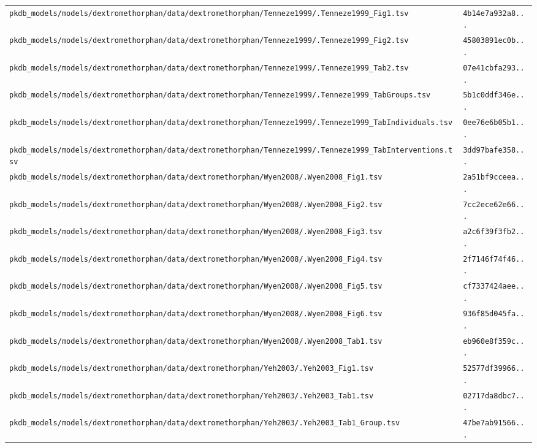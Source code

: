 \begin{longtable}{ll}
\texttt{pkdb\_models/models/dextromethorphan/data/dextromethorphan/Tenneze1999/.Tenneze1999\_Fig1.tsv} & \texttt{4b14e7a932a8...} \\
\texttt{pkdb\_models/models/dextromethorphan/data/dextromethorphan/Tenneze1999/.Tenneze1999\_Fig2.tsv} & \texttt{45803891ec0b...} \\
\texttt{pkdb\_models/models/dextromethorphan/data/dextromethorphan/Tenneze1999/.Tenneze1999\_Tab2.tsv} & \texttt{07e41cbfa293...} \\
\texttt{pkdb\_models/models/dextromethorphan/data/dextromethorphan/Tenneze1999/.Tenneze1999\_TabGroups.tsv} & \texttt{5b1c0ddf346e...} \\
\texttt{pkdb\_models/models/dextromethorphan/data/dextromethorphan/Tenneze1999/.Tenneze1999\_TabIndividuals.tsv} & \texttt{0ee76e6b05b1...} \\
\texttt{pkdb\_models/models/dextromethorphan/data/dextromethorphan/Tenneze1999/.Tenneze1999\_TabInterventions.tsv} & \texttt{3dd97bafe358...} \\
\texttt{pkdb\_models/models/dextromethorphan/data/dextromethorphan/Wyen2008/.Wyen2008\_Fig1.tsv} & \texttt{2a51bf9cceea...} \\
\texttt{pkdb\_models/models/dextromethorphan/data/dextromethorphan/Wyen2008/.Wyen2008\_Fig2.tsv} & \texttt{7cc2ece62e66...} \\
\texttt{pkdb\_models/models/dextromethorphan/data/dextromethorphan/Wyen2008/.Wyen2008\_Fig3.tsv} & \texttt{a2c6f39f3fb2...} \\
\texttt{pkdb\_models/models/dextromethorphan/data/dextromethorphan/Wyen2008/.Wyen2008\_Fig4.tsv} & \texttt{2f7146f74f46...} \\
\texttt{pkdb\_models/models/dextromethorphan/data/dextromethorphan/Wyen2008/.Wyen2008\_Fig5.tsv} & \texttt{cf7337424aee...} \\
\texttt{pkdb\_models/models/dextromethorphan/data/dextromethorphan/Wyen2008/.Wyen2008\_Fig6.tsv} & \texttt{936f85d045fa...} \\
\texttt{pkdb\_models/models/dextromethorphan/data/dextromethorphan/Wyen2008/.Wyen2008\_Tab1.tsv} & \texttt{eb960e8f359c...} \\
\texttt{pkdb\_models/models/dextromethorphan/data/dextromethorphan/Yeh2003/.Yeh2003\_Fig1.tsv} & \texttt{52577df39966...} \\
\texttt{pkdb\_models/models/dextromethorphan/data/dextromethorphan/Yeh2003/.Yeh2003\_Tab1.tsv} & \texttt{02717da8dbc7...} \\
\texttt{pkdb\_models/models/dextromethorphan/data/dextromethorphan/Yeh2003/.Yeh2003\_Tab1\_Group.tsv} & \texttt{47be7ab91566...} \\

\end{longtable}
